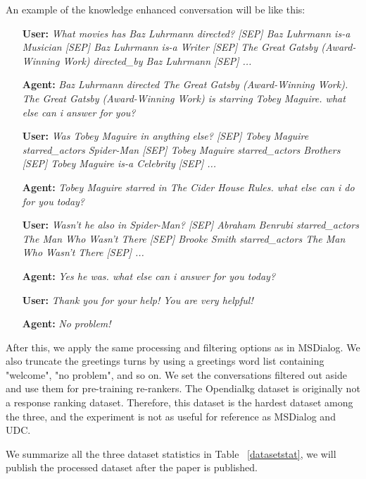 \documentclass[format=acmsmall, review=False, screen=true]{acmart}
\begin{document}
An example of the knowledge enhanced conversation will be like this:
\begin{itemize}
    \item[\textbf{User:}] \textit{What movies has Baz Luhrmann directed? [SEP] Baz Luhrmann is-a Musician [SEP] Baz Luhrmann is-a Writer [SEP] The Great Gatsby (Award-Winning Work) directed\_by Baz Luhrmann [SEP] ...}
    
    \item[\textbf{Agent:}] \textit{Baz Luhrmann directed The Great Gatsby (Award-Winning Work). The Great Gatsby (Award-Winning Work) is starring Tobey Maguire. what else can i answer for you?}
    
    \item[\textbf{User:}] \textit{Was Tobey Maguire in anything else? [SEP] Tobey Maguire starred\_actors Spider-Man [SEP] Tobey Maguire starred\_actors Brothers [SEP] Tobey Maguire is-a Celebrity [SEP] ...}

    \item[\textbf{Agent:}] \textit{Tobey Maguire starred in The Cider House Rules. what else can i do for you today?}
    
    \item[\textbf{User:}] \textit{Wasn't he also in Spider-Man? [SEP] Abraham Benrubi starred\_actors The Man Who Wasn't There [SEP] Brooke Smith starred\_actors The Man Who Wasn't There [SEP] ...}
    
    \item[\textbf{Agent:}] \textit{Yes he was. what else can i answer for you today?}
    
    \item[\textbf{User:}] \textit{Thank you for your help! You are very helpful!}
    
    \item[\textbf{Agent:}] \textit{No problem!}
    
\end{itemize}

After this, we apply the same processing and filtering options as in MSDialog. We also truncate the greetings turns by using a greetings word list containing "welcome", "no problem", and so on. We set the conversations filtered out aside and use them for pre-training re-rankers. The Opendialkg dataset is originally not a response ranking dataset. Therefore, this dataset is the hardest dataset among the three, and the experiment is not as useful for reference as MSDialog and UDC.

We summarize all the three dataset statistics in Table ~\ref{datasetstat}, we will publish the processed dataset after the paper is published. 
\end{document}
